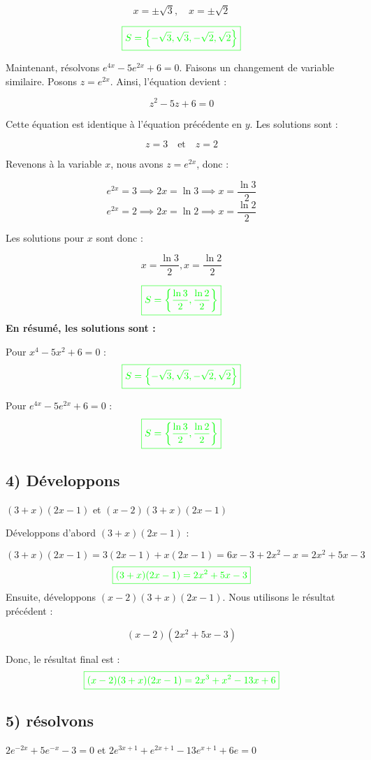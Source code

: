 \documentclass[12pt]{article}
\begin{document}
\[
x = \pm \sqrt{3}, \quad x = \pm \sqrt{2}
\]

\[
\textcolor{green}{\boxed{S=\left\lbrace -\sqrt{3},\sqrt{3},-\sqrt{2},\sqrt{2}\right\rbrace }}
\]

Maintenant, résolvons \(e^{4x} - 5e^{2x} + 6 = 0\). Faisons un changement de variable similaire. Posons \(z = e^{2x}\). Ainsi, l'équation devient :

\[
z^2 - 5z + 6 = 0
\]

Cette équation est identique à l'équation précédente en \(y\). Les solutions sont :

\[
z = 3 \quad \text{et} \quad z = 2
\]

Revenons à la variable \(x\), nous avons \(z = e^{2x}\), donc :

\[
e^{2x} = 3 \implies 2x = \ln 3 \implies x = \frac{\ln 3}{2}
\]
\[
e^{2x} = 2 \implies 2x = \ln 2 \implies x = \frac{\ln 2}{2}
\]

Les solutions pour \(x\) sont donc :

\[
x = \frac{\ln 3}{2}, x = \frac{\ln 2}{2}
\]

\[
\textcolor{green}{\boxed{S=\left\lbrace \frac{\ln 3}{2},\frac{\ln 2}{2}\right\rbrace }}
\]
\textbf{En résumé, les solutions sont :}

Pour \(x^4 - 5x^2 + 6 = 0\) :
\[
\textcolor{green}{\boxed{S=\left\lbrace -\sqrt{3},\sqrt{3},-\sqrt{2},\sqrt{2}\right\rbrace }}
\]

Pour \(e^{4x} - 5e^{2x} + 6 = 0\) :
\[
\textcolor{green}{\boxed{S=\left\lbrace \frac{\ln 3}{2},\frac{\ln 2}{2}\right\rbrace }}
\]
\subsection*{4) Développons } \((3+x)(2x-1)\) et \((x-2)(3+x)(2x-1)\)

Développons d'abord \((3+x)(2x-1)\) :

\[
(3+x)(2x-1) = 3(2x-1)+ x (2x-1)= 6x - 3 + 2x^2 - x = 2x^2 + 5x - 3
\]
\[
\textcolor{green}{\boxed{(3+x)(2x-1)= 2x^2 + 5x - 3}}
\]
Ensuite, développons \((x-2)(3+x)(2x-1)\). Nous utilisons le résultat précédent :

\[
(x-2)(2x^2 + 5x - 3)
\]

Donc, le résultat final est :
\[
\textcolor{green}{\boxed{(x-2)(3+x)(2x-1) = 2x^3 + x^2 - 13x + 6}}
\]
\subsection*{5) résolvons } \(2e^{-2x}+5e^{-x}-3=0\) et \(2e^{3x+1}+e^{2x+1}-13e^{x+1}+6e=0\)
\end{document}
